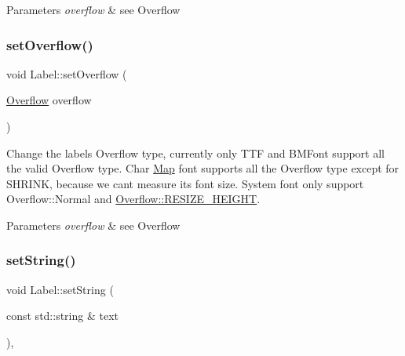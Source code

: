 \begin{DoxyParams}{Parameters}
{\em overflow} & see {\ttfamily Overflow} \\
\hline
\end{DoxyParams}
\mbox{\label{classLabel_a50e5693d5ad8c240aa7178a000ad5f20}} 
\subsubsection{\texorpdfstring{set\+Overflow()}{setOverflow()}\hspace{0.1cm}{\footnotesize\ttfamily [2/2]}}
{\footnotesize\ttfamily void Label\+::set\+Overflow (\begin{DoxyParamCaption}\item[{\hyperlink{classLabel_af7d31998ea743e8ca64eb1a983fa6a4c}{Overflow}}]{overflow }\end{DoxyParamCaption})}

Change the label\textquotesingle{}s Overflow type, currently only T\+TF and B\+M\+Font support all the valid Overflow type. Char \hyperlink{classMap}{Map} font supports all the Overflow type except for S\+H\+R\+I\+NK, because we can\textquotesingle{}t measure it\textquotesingle{}s font size. System font only support Overflow\+::\+Normal and \hyperlink{classLabel_af7d31998ea743e8ca64eb1a983fa6a4ca25ddd126af75d0a6b8e195603cad17eb}{Overflow\+::\+R\+E\+S\+I\+Z\+E\+\_\+\+H\+E\+I\+G\+HT}.


\begin{DoxyParams}{Parameters}
{\em overflow} & see {\ttfamily Overflow} \\
\hline
\end{DoxyParams}
\mbox{\label{classLabel_a01631cdec4595921e78fb085a88118d9}} 
\subsubsection{\texorpdfstring{set\+String()}{setString()}\hspace{0.1cm}{\footnotesize\ttfamily [1/2]}}
{\footnotesize\ttfamily void Label\+::set\+String (\begin{DoxyParamCaption}\item[{const std\+::string \&}]{text }\end{DoxyParamCaption})\hspace{0.3cm}{\ttfamily [override]}, {\ttfamily [virtual]}}

